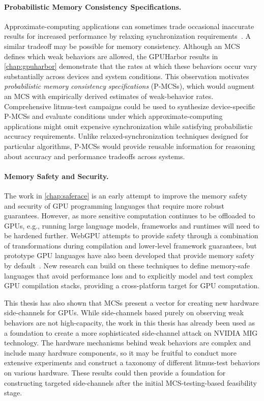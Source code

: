 \paragraph{Probabilistic Memory Consistency Specifications.} Approximate-computing applications can sometimes trade occasional inaccurate results for increased performance by relaxing synchronization requirements~\cite{niu2011hogwild,samadi2013sage}. A similar tradeoff may be possible for memory consistency. Although an MCS defines which weak behaviors are allowed, the GPUHarbor results in \mychap\ref{chap:gpuharbor} demonstrate that the rates at which these behaviors occur vary substantially across devices and system conditions. This observation motivates \textit{probabilistic memory consistency specifications} (P-MCSs), which would augment an MCS with empirically derived estimates of weak-behavior rates. Comprehensive litmus-test campaigns could be used to synthesize device-specific P-MCSs and evaluate conditions under which approximate-computing applications might omit expensive synchronization while satisfying probabilistic accuracy requirements. Unlike relaxed-synchronization techniques designed for particular algorithms, P-MCSs would provide reusable information for reasoning about accuracy and performance tradeoffs across systems.

\paragraph{Memory Safety and Security.} The work in \mychap\ref{chap:saferace} is an early attempt to improve the memory safety and security of GPU programming languages that require more robust guarantees. However, as more sensitive computation continues to be offloaded to GPUs, e.g., running large language models, frameworks and runtimes will need to be hardened further. WebGPU attempts to provide safety through a combination of transformations during compilation and lower-level framework guarantees, but prototype GPU languages have also been developed that provide memory safety by default~\cite{kopcke2024descend}. New research can build on these techniques to define memory-safe languages that avoid performance loss and to explicitly model and test complex GPU compilation stacks, providing a cross-platform target for GPU computation.

This thesis has also shown that MCSs present a vector for creating new hardware side-channels for GPUs. While side-channels based purely on observing weak behaviors are not high-capacity, the work in this thesis has already been used as a foundation to create a more sophisticated side-channel attack on NVIDIA MIG technology. The hardware mechanisms behind weak behaviors are complex and include many hardware components, so it may be fruitful to conduct more extensive experiments and construct a taxonomy of different litmus-test behaviors on various hardware. These results could then provide a foundation for constructing targeted side-channels after the initial MCS-testing-based feasibility stage.

